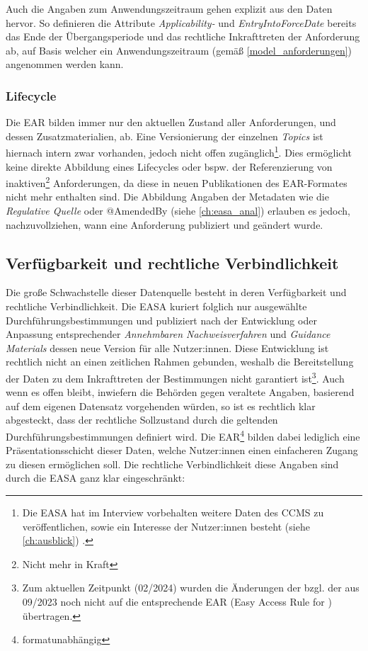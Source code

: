     Auch die Angaben zum Anwendungszeitraum gehen explizit aus den Daten hervor. 
    So definieren die Attribute \textit{Applicability-} und \textit{EntryIntoForceDate} bereits das Ende der Übergangsperiode und das rechtliche Inkrafttreten der Anforderung ab, auf Basis welcher ein Anwendungszeitraum (gemäß \ref{model_anforderungen}) angenommen werden kann.

\subsubsection{Lifecycle}
    
    Die \ac{EAR} bilden immer nur den aktuellen Zustand aller Anforderungen, und dessen Zusatzmaterialien, ab.
    Eine Versionierung der einzelnen \textit{Topics} ist hiernach intern zwar vorhanden, jedoch nicht offen zugänglich\footnote{Die \ac{EASA} hat im Interview vorbehalten weitere Daten des \ac{CCMS} zu veröffentlichen, sowie ein Interesse der Nutzer:innen besteht (siehe \ref{ch:ausblick}) \cite{easa_xml_export}.}.
    Dies ermöglicht keine direkte Abbildung eines Lifecycles oder bspw. der Referenzierung von inaktiven\footnote{Nicht mehr in Kraft} Anforderungen, da diese in neuen Publikationen des \ac{EAR}-Formates nicht mehr enthalten sind.
    Die Abbildung 
    Angaben der Metadaten wie die \textit{Regulative Quelle} oder @AmendedBy (siehe \ref{ch:easa_anal}) erlauben es jedoch, nachzuvollziehen, wann eine Anforderung publiziert und geändert wurde.
    
\subsection{Verfügbarkeit und rechtliche Verbindlichkeit}

    Die große Schwachstelle dieser Datenquelle besteht in deren Verfügbarkeit und rechtliche Verbindlichkeit.
    Die \ac{EASA} kuriert folglich nur ausgewählte Durchführungsbestimmungen und publiziert nach der Entwicklung oder Anpassung entsprechender \textit{Annehmbaren Nachweisverfahren} und \textit{Guidance Materials} dessen neue Version für alle Nutzer:innen.
    Diese Entwicklung ist rechtlich nicht an einen zeitlichen Rahmen gebunden, weshalb die Bereitstellung der Daten zu dem Inkrafttreten der Bestimmungen nicht garantiert ist\footnote{Zum aktuellen Zeitpunkt (02/2024) wurden die Änderungen der  bzgl. der  aus 09/2023 noch nicht auf die entsprechende \ac{EAR} (Easy Access Rule for \atmans) übertragen.}.
    Auch wenn es offen bleibt, inwiefern die Behörden gegen veraltete Angaben, basierend auf dem eigenen Datensatz vorgehenden würden, so ist es rechtlich klar abgesteckt, dass der rechtliche Sollzustand durch die geltenden Durchführungsbestimmungen definiert wird.
    Die \ac{EAR}\footnote{formatunabhängig} bilden dabei lediglich eine Präsentationsschicht dieser Daten, welche Nutzer:innen einen einfacheren Zugang zu diesen ermöglichen soll. 
    Die rechtliche Verbindlichkeit diese Angaben sind durch die \ac{EASA} ganz klar eingeschränkt:
    
